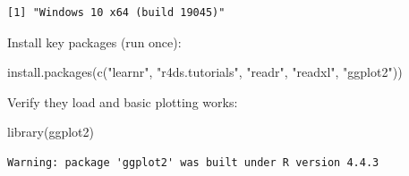 \documentclass[
  letterpaper,
  DIV=11,
  numbers=noendperiod]{scrreprt}
\newenvironment{Shaded}{\begin{snugshade}}{\end{snugshade}}
\newcommand{\AttributeTok}[1]{\textcolor[rgb]{0.40,0.45,0.13}{#1}}
\newcommand{\DecValTok}[1]{\textcolor[rgb]{0.68,0.00,0.00}{#1}}
\newcommand{\FloatTok}[1]{\textcolor[rgb]{0.68,0.00,0.00}{#1}}
\newcommand{\FunctionTok}[1]{\textcolor[rgb]{0.28,0.35,0.67}{#1}}
\newcommand{\NormalTok}[1]{\textcolor[rgb]{0.00,0.23,0.31}{#1}}
\newcommand{\OtherTok}[1]{\textcolor[rgb]{0.00,0.23,0.31}{#1}}
\newcommand{\SpecialCharTok}[1]{\textcolor[rgb]{0.37,0.37,0.37}{#1}}
\newcommand{\StringTok}[1]{\textcolor[rgb]{0.13,0.47,0.30}{#1}}
\begin{document}
\begin{Shaded}
\end{Shaded}

\begin{verbatim}
[1] "Windows 10 x64 (build 19045)"
\end{verbatim}

Install key packages (run once):

\begin{Shaded}
\begin{Highlighting}[]
\FunctionTok{install.packages}\NormalTok{(}\FunctionTok{c}\NormalTok{(}\StringTok{"learnr"}\NormalTok{, }\StringTok{"r4ds.tutorials"}\NormalTok{, }\StringTok{"readr"}\NormalTok{, }\StringTok{"readxl"}\NormalTok{, }\StringTok{"ggplot2"}\NormalTok{))}
\end{Highlighting}
\end{Shaded}

Verify they load and basic plotting works:

\begin{Shaded}
\begin{Highlighting}[]
\FunctionTok{library}\NormalTok{(ggplot2)}
\end{Highlighting}
\end{Shaded}

\begin{verbatim}
Warning: package 'ggplot2' was built under R version 4.4.3
\end{verbatim}

\begin{Shaded}
\end{Shaded}
\end{document}
